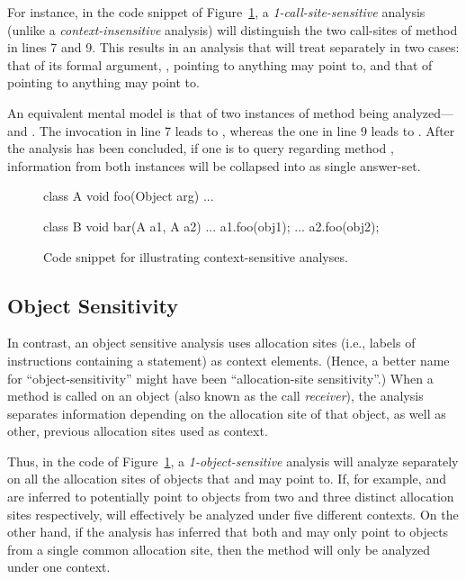 For instance, in the code snippet of Figure~\ref{fig:hybrid:snippet}, a \emph{1-call-site-sensitive} analysis (unlike a \emph{context-insensitive} analysis) will distinguish the two call-sites of method  in lines 7 and 9. This results in an analysis that will treat  separately in two cases: that of its formal argument, , pointing to anything  may point to, and that of  pointing to anything  may point to.

An equivalent mental model is that of two instances of method  being analyzed--- and . The invocation in line 7 leads to , whereas the one in line 9 leads to . After the analysis has been concluded, if one is to query regarding method , information from both instances will be collapsed into as single answer-set.

\begin{figure}[htp]
\begin{javacode}
class A {
    void foo(Object arg) { ... }
}

class B {
    void bar(A a1, A a2) {
        ...
        a1.foo(obj1);
        ...
        a2.foo(obj2);
    }
}
\end{javacode}
\caption{Code snippet for illustrating context-sensitive analyses.}
\label{fig:hybrid:snippet}
\end{figure}

\subsection{Object Sensitivity}

In contrast, an object sensitive analysis uses allocation sites (i.e., labels of instructions containing a  statement) as context elements. (Hence, a better name for ``object-sensitivity'' might have been ``allocation-site sensitivity''.) When a method is called on an object (also known as the call \emph{receiver}), the analysis separates information depending on the allocation site of that object, as well as other, previous allocation sites used as context.

Thus, in the code of Figure~\ref{fig:hybrid:snippet}, a \emph{1-object-sensitive} analysis will analyze  separately on all the allocation sites of objects that  and  may point to. If, for example,  and  are inferred to potentially point to objects from two and three distinct allocation sites respectively,  will effectively be analyzed under five different contexts. On the other hand, if the analysis has inferred that both  and  may only point to objects from a single common allocation site, then the method will only be analyzed under one context.

